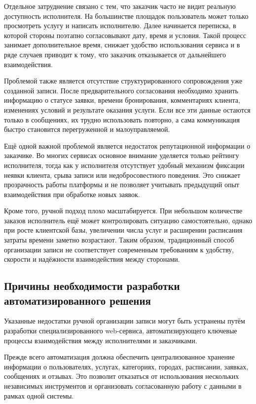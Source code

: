 Отдельное затруднение связано с тем, что заказчик часто не видит реальную доступность исполнителя. На большинстве площадок пользователь может только просмотреть услугу и написать исполнителю. Далее начинается переписка, в которой стороны поэтапно согласовывают дату, время и условия. Такой процесс занимает дополнительное время, снижает удобство использования сервиса и в ряде случаев приводит к тому, что заказчик отказывается от дальнейшего взаимодействия.

Проблемой также является отсутствие структурированного сопровождения уже созданной записи. После предварительного согласования необходимо хранить информацию о статусе заявки, времени бронирования, комментариях клиента, изменениях условий и результате оказания услуги. Если все эти данные остаются только в сообщениях, их трудно использовать повторно, а сама коммуникация быстро становится перегруженной и малоуправляемой.

Ещё одной важной проблемой является недостаток репутационной информации о заказчике. Во многих сервисах основное внимание уделяется только рейтингу исполнителя, тогда как у исполнителя отсутствует удобный механизм фиксации неявки клиента, срыва записи или недобросовестного поведения. Это снижает прозрачность работы платформы и не позволяет учитывать предыдущий опыт взаимодействия при обработке новых заявок.

Кроме того, ручной подход плохо масштабируется. При небольшом количестве заказов исполнитель ещё может контролировать ситуацию самостоятельно, однако при росте клиентской базы, увеличении числа услуг и расширении расписания затраты времени заметно возрастают. Таким образом, традиционный способ организации записи не соответствует современным требованиям к удобству, скорости и надёжности взаимодействия между сторонами.

\subsection{Причины необходимости разработки автоматизированного решения}

Указанные недостатки ручной организации записи могут быть устранены путём разработки специализированного web-сервиса, автоматизирующего ключевые процессы взаимодействия между исполнителями и заказчиками.

Прежде всего автоматизация должна обеспечить централизованное хранение информации о пользователях, услугах, категориях, городах, расписании, заявках, сообщениях и отзывах. Это позволит отказаться от использования нескольких независимых инструментов и организовать согласованную работу с данными в рамках одной системы.

